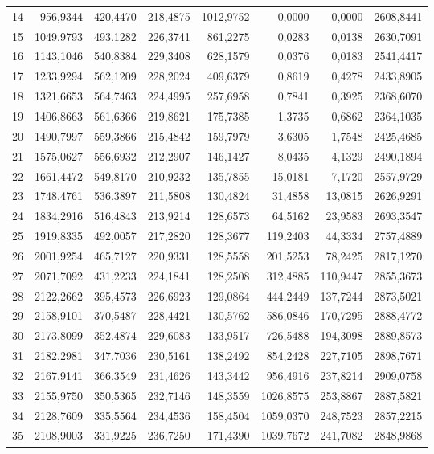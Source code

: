 \begin{small}
\begin{longtable}{rrrrrrrr}
14 & 956,9344 & 420,4470 & 218,4875 & 1012,9752 & 0,0000 & 0,0000 & 2608,8441 \\
15 & 1049,9793 & 493,1282 & 226,3741 & 861,2275 & 0,0283 & 0,0138 & 2630,7091 \\
16 & 1143,1046 & 540,8384 & 229,3408 & 628,1579 & 0,0376 & 0,0183 & 2541,4417 \\
17 & 1233,9294 & 562,1209 & 228,2024 & 409,6379 & 0,8619 & 0,4278 & 2433,8905 \\
18 & 1321,6653 & 564,7463 & 224,4995 & 257,6958 & 0,7841 & 0,3925 & 2368,6070 \\
19 & 1406,8663 & 561,6366 & 219,8621 & 175,7385 & 1,3735 & 0,6862 & 2364,1035 \\
20 & 1490,7997 & 559,3866 & 215,4842 & 159,7979 & 3,6305 & 1,7548 & 2425,4685 \\
21 & 1575,0627 & 556,6932 & 212,2907 & 146,1427 & 8,0435 & 4,1329 & 2490,1894 \\
22 & 1661,4472 & 549,8170 & 210,9232 & 135,7855 & 15,0181 & 7,1720 & 2557,9729 \\
23 & 1748,4761 & 536,3897 & 211,5808 & 130,4824 & 31,4858 & 13,0815 & 2626,9291 \\
24 & 1834,2916 & 516,4843 & 213,9214 & 128,6573 & 64,5162 & 23,9583 & 2693,3547 \\
25 & 1919,8335 & 492,0057 & 217,2820 & 128,3677 & 119,2403 & 44,3334 & 2757,4889 \\
26 & 2001,9254 & 465,7127 & 220,9331 & 128,5558 & 201,5253 & 78,2425 & 2817,1270 \\
27 & 2071,7092 & 431,2233 & 224,1841 & 128,2508 & 312,4885 & 110,9447 & 2855,3673 \\
28 & 2122,2662 & 395,4573 & 226,6923 & 129,0864 & 444,2449 & 137,7244 & 2873,5021 \\
29 & 2158,9101 & 370,5487 & 228,4421 & 130,5762 & 586,0846 & 170,7295 & 2888,4772 \\
30 & 2173,8099 & 352,4874 & 229,6083 & 133,9517 & 726,5488 & 194,3098 & 2889,8573 \\
31 & 2182,2981 & 347,7036 & 230,5161 & 138,2492 & 854,2428 & 227,7105 & 2898,7671 \\
32 & 2167,9141 & 366,3549 & 231,4626 & 143,3442 & 956,4916 & 237,8214 & 2909,0758 \\
33 & 2155,9750 & 350,5365 & 232,7146 & 148,3559 & 1026,8575 & 253,8867 & 2887,5821 \\
34 & 2128,7609 & 335,5564 & 234,4536 & 158,4504 & 1059,0370 & 248,7523 & 2857,2215 \\
35 & 2108,9003 & 331,9225 & 236,7250 & 171,4390 & 1039,7672 & 241,7082 & 2848,9868 \\

\end{longtable}
\end{small}
